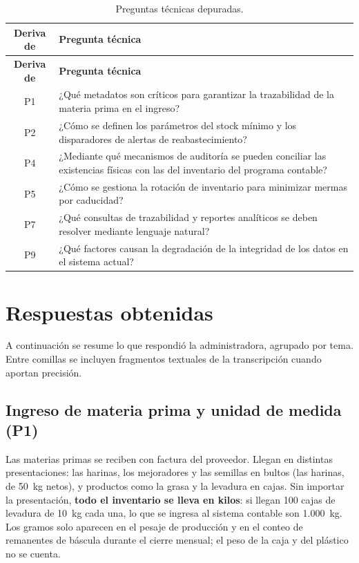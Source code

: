 \begin{longtable}{|c|p{12cm}|}
\caption{Preguntas técnicas depuradas.}
\label{tab:req_preguntas_depuradas}\\
\hline
\textbf{Deriva de} & \textbf{Pregunta técnica} \\
\hline
\endfirsthead
\hline
\textbf{Deriva de} & \textbf{Pregunta técnica} \\
\hline
\endhead
P1 & ¿Qué metadatos son críticos para garantizar la trazabilidad de la materia prima en el ingreso? \\ \hline
P2 & ¿Cómo se definen los parámetros del stock mínimo y los disparadores de alertas de reabastecimiento? \\ \hline
P4 & ¿Mediante qué mecanismos de auditoría se pueden conciliar las existencias físicas con las del inventario del programa contable? \\ \hline
P5 & ¿Cómo se gestiona la rotación de inventario para minimizar mermas por caducidad? \\ \hline
P7 & ¿Qué consultas de trazabilidad y reportes analíticos se deben resolver mediante lenguaje natural? \\ \hline
P9 & ¿Qué factores causan la degradación de la integridad de los datos en el sistema actual? \\ \hline
\end{longtable}

\section{Respuestas obtenidas}
\label{sec:req_respuestas}

A continuación se resume lo que respondió la administradora, agrupado por tema. Entre comillas se incluyen fragmentos textuales de la transcripción cuando aportan precisión.

\subsection{Ingreso de materia prima y unidad de medida (P1)}

Las materias primas se reciben con factura del proveedor. Llegan en distintas presentaciones: las harinas, los mejoradores y las semillas en bultos (las harinas, de 50~kg netos), y productos como la grasa y la levadura en cajas. Sin importar la presentación, \textbf{todo el inventario se lleva en kilos}: si llegan 100 cajas de levadura de 10~kg cada una, lo que se ingresa al sistema contable son 1.000~kg. Los gramos solo aparecen en el pesaje de producción y en el conteo de remanentes de báscula durante el cierre mensual; el peso de la caja y del plástico no se cuenta.

